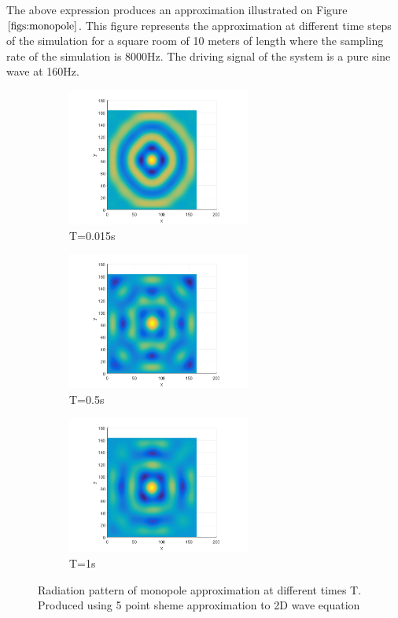 The above expression produces an approximation illustrated on Figure $\ref{figs:monopole}$. This figure represents the approximation at different time steps of the simulation for a square room of 10 meters of length where the sampling rate of the simulation is 8000Hz. The driving signal of the system is a pure sine wave at 160Hz.
\begin{figure}[h]
\label{figs:monopole}
\begin{subfigure}{0.3 \textwidth}
	\centering
	\includegraphics[width=6cm]{../Chapter_4/_Figs/Monopole001_5point_160Hz_L10m_8000Fs.png}
	\caption{T=0.015s}
\end{subfigure}
\begin{subfigure}{0.3 \textwidth}
	\centering
	\includegraphics[width=6cm]{../Chapter_4/_Figs/Monopole05_5point_160Hz_L10m_8000Fs.png}
	\caption{T=0.5s}
\end{subfigure}
\begin{subfigure}{0.3 \textwidth}
	\centering
	\includegraphics[width=6cm]{../Chapter_4/_Figs/Monopole1_5point_160Hz_L10m_8000Fs.png}
	\caption{T=1s}
\end{subfigure}
\caption{Radiation pattern of monopole approximation at different times T. Produced using 5 point sheme approximation to 2D wave equation}
\end{figure}


